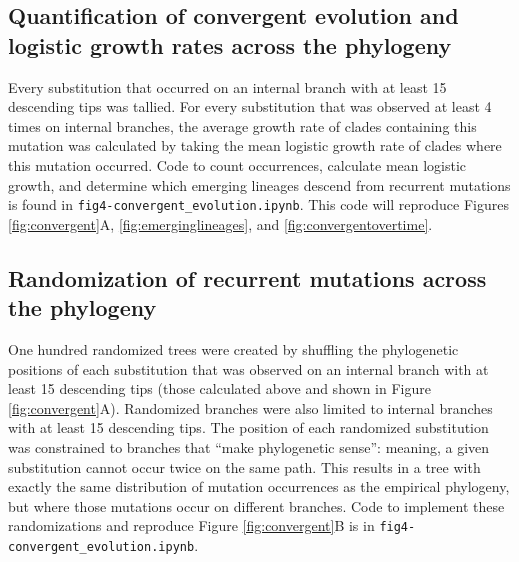 \documentclass[11pt,oneside,letterpaper]{article}
\begin{document}
\subsection*{Quantification of convergent evolution and logistic growth rates across the phylogeny}
Every substitution that occurred on an internal branch with at least 15 descending tips was tallied.
For every substitution that was observed at least 4 times on internal branches, the average growth rate of clades containing this mutation was calculated by taking the mean logistic growth rate of clades where this mutation occurred.
Code to count occurrences, calculate mean logistic growth, and determine which emerging lineages descend from recurrent mutations is found in \texttt{fig4-convergent\_evolution.ipynb}.
This code will reproduce Figures \ref{fig:convergent}A, \ref{fig:emerginglineages}, and \ref{fig:convergentovertime}.

\subsection*{Randomization of recurrent mutations across the phylogeny}
One hundred randomized trees were created by shuffling the phylogenetic positions of each substitution that was observed on an internal branch with at least 15 descending tips (those calculated above and shown in Figure \ref{fig:convergent}A).
Randomized branches were also limited to internal branches with at least 15 descending tips. The position of each randomized substitution was constrained to branches that “make phylogenetic sense”: meaning, a given substitution cannot occur twice on the same path.
This results in a tree with exactly the same distribution of mutation occurrences as the empirical phylogeny, but where those mutations occur on different branches.
Code to implement these randomizations and reproduce Figure \ref{fig:convergent}B is in \texttt{fig4-convergent\_evolution.ipynb}.
\end{document}
